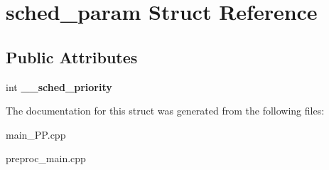 \hypertarget{structsched__param}{\section{sched\+\_\+param Struct Reference}
\label{structsched__param}
}
\subsection*{Public Attributes}
\begin{DoxyCompactItemize}
\item 
\hypertarget{structsched__param_a50a7810364da732592e7e9fcdaa3da22}{int {\bfseries \+\_\+\+\_\+sched\+\_\+priority}}\label{structsched__param_a50a7810364da732592e7e9fcdaa3da22}

\end{DoxyCompactItemize}


The documentation for this struct was generated from the following files\+:\begin{DoxyCompactItemize}
\item 
main\+\_\+\+P\+P.\+cpp\item 
preproc\+\_\+main.\+cpp\end{DoxyCompactItemize}
